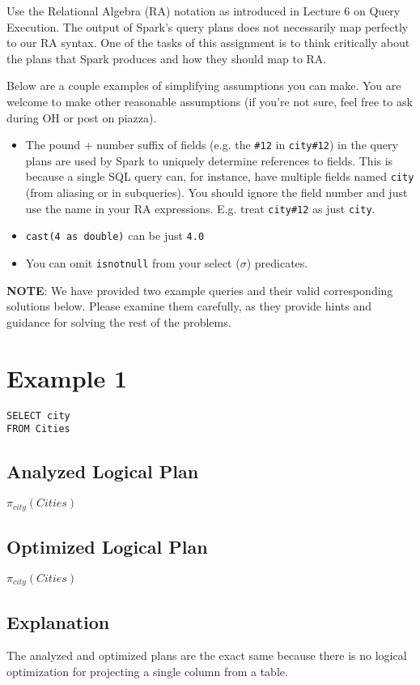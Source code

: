 \documentclass[12pt]{article}
\begin{document}
Use the Relational Algebra (RA) notation as introduced in Lecture 6 on Query Execution.
The output of Spark's query plans does not necessarily map perfectly to our RA syntax.
One of the tasks of this assignment is to think
critically about the plans that Spark produces and how they should map
to RA.

Below are a couple examples of simplifying assumptions you can make.
You are welcome to make other reasonable assumptions (if you're not sure,
feel free to ask during OH or post on piazza).
\begin{itemize}
    \item The pound + number suffix of fields
        (e.g. the \verb|#12| in \verb|city#12|)
        in the query plans are
        used by Spark to uniquely determine references to fields.
        This is because a single SQL query can, for instance, have multiple
        fields named \verb|city| (from aliasing or in subqueries).
        You should ignore the field number and just use the name in your
        RA expressions.
        E.g. treat \verb|city#12| as just \verb|city|.
    \item \verb|cast(4 as double)| can be just \verb|4.0|
    \item You can omit \texttt{isnotnull} from your select ($\sigma$) predicates.
\end{itemize}

\textbf{NOTE}:
We have provided two example queries and their valid corresponding solutions below.
Please examine them carefully, as they provide hints and guidance for solving the rest of the problems.

\section*{Example 1}
\begin{verbatim}
SELECT city
FROM Cities
\end{verbatim}

\subsection*{Analyzed Logical Plan}
$\pi_{city}(Cities)$

\subsection*{Optimized Logical Plan}
$\pi_{city}(Cities)$

\subsection*{Explanation}
The analyzed and optimized plans are the exact same because there is no
logical optimization for projecting a single column from a table.
\end{document}
